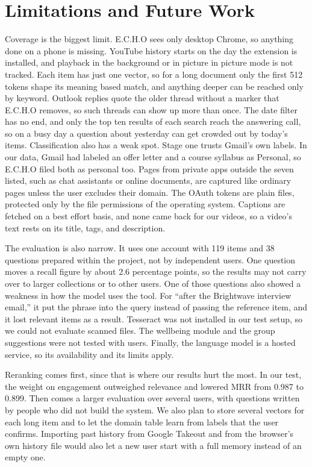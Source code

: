 \documentclass[conference]{IEEEtran}
\begin{document}
\section{Limitations and Future Work}\label{sec:limits}
Coverage is the biggest limit. E.C.H.O sees only desktop Chrome, so anything done on a phone is missing. YouTube history starts on the day the extension is installed, and playback in the background or in picture in picture mode is not tracked. Each item has just one vector, so for a long document only the first 512 tokens shape its meaning based match, and anything deeper can be reached only by keyword. Outlook replies quote the older thread without a marker that E.C.H.O removes, so such threads can show up more than once. The date filter has no end, and only the top ten results of each search reach the answering call, so on a busy day a question about yesterday can get crowded out by today's items. Classification also has a weak spot. Stage one trusts Gmail's own labels. In our data, Gmail had labeled an offer letter and a course syllabus as Personal, so E.C.H.O filed both as personal too. Pages from private apps outside the seven listed, such as chat assistants or online documents, are captured like ordinary pages unless the user excludes their domain. The OAuth tokens are plain files, protected only by the file permissions of the operating system. Captions are fetched on a best effort basis, and none came back for our videos, so a video's text rests on its title, tags, and description.

The evaluation is also narrow. It uses one account with 119 items and 38 questions prepared within the project, not by independent users. One question moves a recall figure by about 2.6 percentage points, so the results may not carry over to larger collections or to other users. One of those questions also showed a weakness in how the model uses the tool. For ``after the Brightwave interview email,'' it put the phrase into the query instead of passing the reference item, and it lost relevant items as a result. Tesseract was not installed in our test setup, so we could not evaluate scanned files. The wellbeing module and the group suggestions were not tested with users. Finally, the language model is a hosted service, so its availability and its limits apply.

Reranking comes first, since that is where our results hurt the most. In our test, the weight on engagement outweighed relevance and lowered MRR from 0.987 to 0.899. Then comes a larger evaluation over several users, with questions written by people who did not build the system. We also plan to store several vectors for each long item and to let the domain table learn from labels that the user confirms. Importing past history from Google Takeout and from the browser's own history file would also let a new user start with a full memory instead of an empty one.
\end{document}
